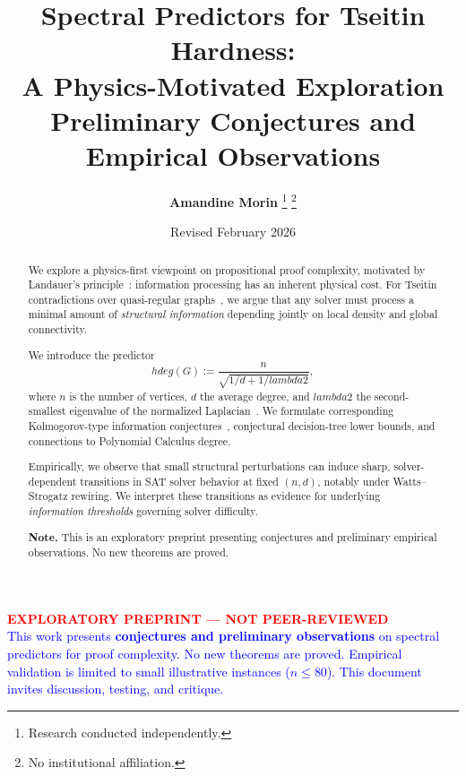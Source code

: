 \documentclass[11pt,a4paper]{article}
\title{\textbf{Spectral Predictors for Tseitin Hardness:\\
A Physics-Motivated Exploration}\\
\large Preliminary Conjectures and Empirical Observations}
\author{\textbf{Amandine Morin}%
\footnote{Research conducted independently.}%
\footnote{No institutional affiliation.}}
\date{Revised February 2026}
\def\gap{lambda2}%
\def\hdeg{hdeg}%
\theoremstyle{remark}
\newcommand{\gap}{\lambda_2}
\newcommand{\hdeg}{\widehat{\deg}}
\begin{document}
\maketitle

\begin{center}
\small
\textcolor{red}{\textbf{EXPLORATORY PREPRINT — NOT PEER-REVIEWED}}\\[0.5em]
\textcolor{blue}{This work presents \textbf{conjectures and preliminary observations}
on spectral predictors for proof complexity. No new theorems are proved.
Empirical validation is limited to small illustrative instances ($n \leq 80$).
This document invites discussion, testing, and critique.}
\end{center}

\begin{abstract}
We explore a physics-first viewpoint on propositional proof complexity, motivated by
Landauer's principle~\cite{Landauer1961}: information processing has an inherent physical cost.
For Tseitin contradictions over quasi-regular graphs~\cite{Tseitin1968,KrajicekBook}, we argue
that any solver must process a minimal amount of \emph{structural information} depending jointly
on local density and global connectivity.

We introduce the predictor
\[
\hdeg(G) := \frac{n}{\sqrt{1/d + 1/\gap}},
\]
where $n$ is the number of vertices, $d$ the average degree, and $\gap$ the second-smallest
eigenvalue of the normalized Laplacian~\cite{Chung1997}.
We formulate corresponding Kolmogorov-type information conjectures~\cite{LiVitanyi},
conjectural decision-tree lower bounds, and connections to Polynomial Calculus degree.

Empirically, we observe that small structural perturbations can induce sharp,
solver-dependent transitions in SAT solver behavior at fixed $(n,d)$,
notably under Watts--Strogatz rewiring.
We interpret these transitions as evidence for underlying \emph{information thresholds}
governing solver difficulty.

\medskip
\noindent\textbf{Note.} This is an exploratory preprint presenting conjectures and
preliminary empirical observations. No new theorems are proved.
\end{abstract}
\end{document}
